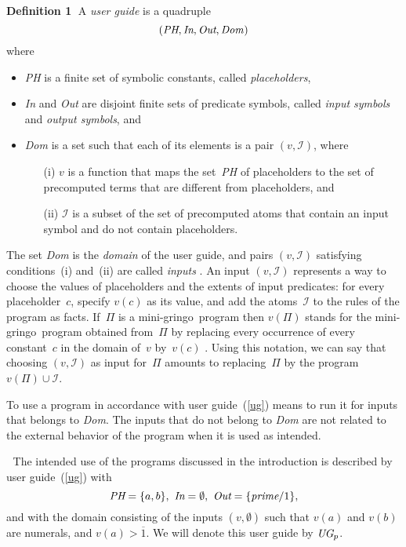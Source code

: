 \documentclass{article}
\def\beq{\begin{equation}}
\def\eeq#1{\label{#1}\end{equation}}
\def\gringo{{\sc gringo}}
\def\num{\overline}
\newcommand{\I}{\mathcal{I}}
\begin{document}
{\bf Definition 1}$\;$
A \emph{user guide} is a quadruple
\beq
(\emph{PH},\emph{In},\emph{Out},\emph{Dom\/})
\eeq{ug}
where
\begin{itemize}
\item \emph{PH} is a finite set of symbolic constants, called
  \emph{placeholders},
\item \emph{In} and \emph{Out} are disjoint finite sets of predicate
  symbols, called \emph{input symbols} and \emph{output symbols},
  and
\item \emph{Dom} is a set such that each of its elements is a pair $(v,\I)$,
  where
  \begin{itemize}
    \item [(i)]$v$ is a function that maps the set~\emph{PH} of placeholders
      to the set of precomputed terms that are different from
      placeholders, and
    \item  [(ii)] $\I$ is a subset of the set of precomputed atoms that contain
      an input symbol and do not contain placeholders.
\end{itemize}
\end{itemize}

The set \emph{Dom} is the \emph{domain} of the user guide, and
pairs $(v,\I)$ satisfying conditions~(i) and~(ii) are called \emph{inputs}
\cite[Section~5.2]{fan20}.
An input $(v,\I)$ represents a way to choose the values of
placeholders and the extents of input predicates: for every
placeholder~$c$, specify $v(c)$ as its value, and add the atoms~$\I$
to the rules of the program as facts.  If~$\Pi$ is a mini-\gringo\ program
then $v(\Pi)$ stands for the mini-\gringo\ program obtained from~$\Pi$ by
replacing every occurrence of every constant~$c$ in the domain of~$v$
by~$v(c)$
\cite[Section~2.4]{fan22}.  Using this notation, we can say that
choosing $(v,\I)$ as input for~$\Pi$ amounts to
replacing~$\Pi$ by the program $v(\Pi)\cup\I$.

To use a program in accordance with user guide~(\ref{ug})
means to run it for inputs that belongs to \emph{Dom}.  The
inputs that do not belong to \emph{Dom} are not related to the
external behavior of the program when it is used as intended.

\medskip{}$\;$ The intended use of the
programs discussed in the introduction is
described by user guide~(\ref{ug}) with
$$\emph{PH} = \{a,b\},\ \emph{In} = \emptyset,\
  \emph{Out} = \{\emph{prime}/1\},$$
and with the domain consisting of the inputs $(v,\emptyset)$ such that
$v(a)$ and $v(b)$ are numerals, and $v(a)>\num 1$.  We will denote this
user guide by $\emph{UG}_p$.
\end{document}
